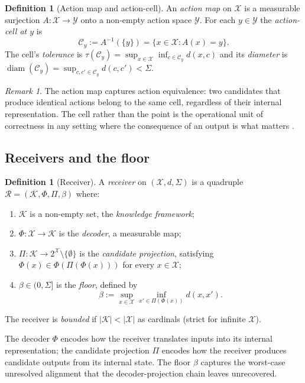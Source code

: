 \documentclass[11pt,twocolumn,a4paper]{article}
\theoremstyle{definition}
\newtheorem{definition}[theorem]{Definition}
\theoremstyle{remark}
\newtheorem{remark}[theorem]{Remark}
\DeclareMathOperator{\diam}{diam}
\newcommand{\Cands}{\mathcal{X}}
\newcommand{\Action}{\mathcal{Y}}
\newcommand{\Knowl}{\mathcal{K}}
\newcommand{\Cell}{\mathcal{C}}
\newcommand{\receiver}{\mathcal{R}}
\newcommand{\Sigmax}{\Sigma}
\begin{document}
\begin{definition}[Action map and action-cell]
\label{def:action}
An \emph{action map} on $\Cands$ is a measurable surjection $A : \Cands \to \Action$ onto a non-empty action space $\Action$. For each $y \in \Action$ the \emph{action-cell at $y$} is
\[
\Cell_y := A^{-1}(\{y\}) = \{x \in \Cands : A(x) = y\}.
\]
The cell's \emph{tolerance} is $\tau(\Cell_y) = \sup_{x \in \Cands} \inf_{c \in \Cell_y} d(x, c)$ and its \emph{diameter} is $\diam(\Cell_y) = \sup_{c,c' \in \Cell_y} d(c, c') < \Sigmax$.
\end{definition}

\begin{remark}
The action map captures action equivalence: two candidates that produce identical actions belong to the same cell, regardless of their internal representation. The cell rather than the point is the operational unit of correctness in any setting where the consequence of an output is what matters \citep{tarski1933pojecie}.
\end{remark}

\subsection{Receivers and the floor}

\begin{definition}[Receiver]
\label{def:receiver}
A \emph{receiver} on $(\Cands, d, \Sigmax)$ is a quadruple $\receiver = (\Knowl, \Phi, \Pi, \beta)$ where:
\begin{enumerate}[nosep,label=(\roman*)]
\item $\Knowl$ is a non-empty set, the \emph{knowledge framework};
\item $\Phi : \Cands \to \Knowl$ is the \emph{decoder}, a measurable map;
\item $\Pi : \Knowl \to 2^{\Cands} \setminus \{\emptyset\}$ is the \emph{candidate projection}, satisfying $\Phi(x) \in \Phi(\Pi(\Phi(x)))$ for every $x \in \Cands$;
\item $\beta \in (0, \Sigmax]$ is the \emph{floor}, defined by
\[
\beta := \sup_{x \in \Cands} \inf_{x' \in \Pi(\Phi(x))} d(x, x').
\]
\end{enumerate}
The receiver is \emph{bounded} if $|\Knowl| < |\Cands|$ as cardinals (strict for infinite $\Cands$).
\end{definition}

The decoder $\Phi$ encodes how the receiver translates inputs into its internal representation; the candidate projection $\Pi$ encodes how the receiver produces candidate outputs from its internal state. The floor $\beta$ captures the worst-case unresolved alignment that the decoder-projection chain leaves unrecovered.
\end{document}
